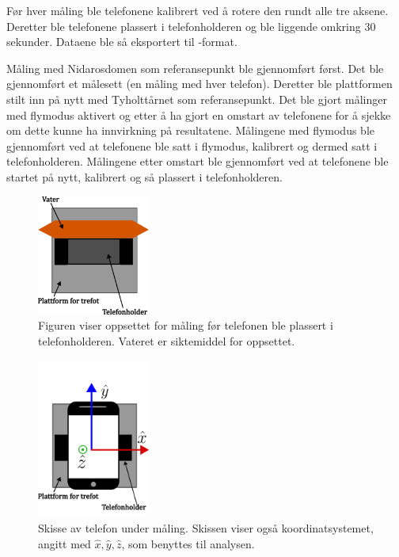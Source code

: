 Før hver måling ble telefonene kalibrert ved å rotere den rundt alle tre aksene. Deretter ble telefonene plassert i telefonholderen og ble liggende omkring $30$ sekunder. Dataene ble så eksportert til -format. 

Måling med Nidarosdomen som referansepunkt ble gjennomført først. Det ble gjennomført et målesett (en måling med hver telefon). Deretter ble plattformen stilt inn på nytt med Tyholttårnet som referansepunkt. Det ble gjort målinger med flymodus aktivert og etter å ha gjort en omstart av telefonene for å sjekke om dette kunne ha innvirkning på resultatene. Målingene med flymodus ble gjennomført ved at telefonene ble satt i flymodus, kalibrert og dermed satt i telefonholderen. Målingene etter omstart ble gjennomført ved at telefonene ble startet på nytt, kalibrert og så plassert i telefonholderen.




\begin{figure}[h!]
    \centering
    \includegraphics[width=0.33\textwidth]{img/Plattform med vater.pdf}                 
    \caption{Figuren viser oppsettet for måling før telefonen ble plassert i telefonholderen. Vateret er siktemiddel for oppsettet.}
    \label{fig:med_vater}
\end{figure}

\begin{figure}[h!]
    \centering
    \includegraphics[width=0.33\textwidth]{img/Plattform med telefoni.pdf}
    \caption{Skisse av telefon under måling. Skissen viser også koordinatsystemet, angitt med $\hat{x}, \hat{y}, \hat{z}$, som benyttes til analysen.}
    \label{fig:telf_akser}
\end{figure}





